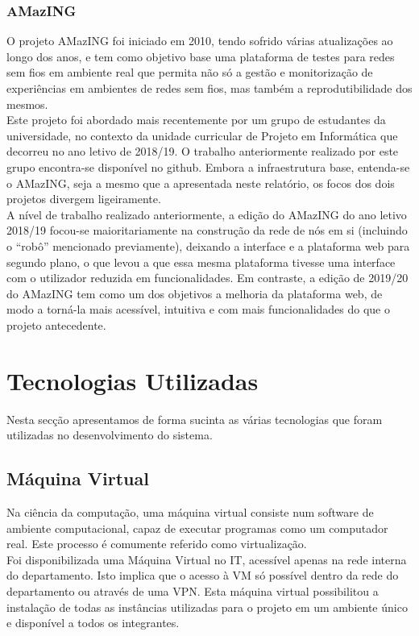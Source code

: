 \subsubsection{AMazING}
O projeto AMazING foi iniciado em 2010, tendo sofrido várias atualizações ao longo dos anos, e tem como objetivo base uma plataforma de testes para redes sem fios em ambiente real que permita não só a gestão e monitorização de experiências em ambientes de redes sem fios, mas também a reprodutibilidade dos mesmos.\newline\\
Este projeto foi abordado mais recentemente por um grupo de estudantes da universidade, no contexto da unidade curricular de Projeto em Informática que decorreu no ano letivo de 2018/19. O trabalho anteriormente realizado por este grupo encontra-se disponível no github. Embora a infraestrutura base, entenda-se o AMazING, seja a mesmo que a apresentada neste relatório, os focos dos dois projetos divergem ligeiramente.\newline\\
A nível de trabalho realizado anteriormente, a edição do AMazING do ano letivo 2018/19 focou-se maioritariamente na construção da rede de nós em si (incluindo o “robô” mencionado previamente), deixando a interface e a plataforma web para segundo plano, o que levou a que essa mesma plataforma tivesse uma interface com o utilizador reduzida em funcionalidades. Em contraste, a edição de 2019/20 do AMazING tem como um dos objetivos a melhoria da plataforma web, de modo a torná-la mais acessível, intuitiva e com mais funcionalidades do que o projeto antecedente.


\section{Tecnologias Utilizadas}
Nesta secção apresentamos de forma sucinta as várias tecnologias que foram utilizadas no desenvolvimento do sistema.

\subsection{Máquina Virtual}
Na ciência da computação, uma máquina virtual consiste num software de ambiente computacional, capaz de executar programas como um computador real. Este processo é comumente referido como virtualização. \cite{virtual}\newline\\
Foi disponibilizada uma Máquina Virtual no IT, acessível apenas na rede interna do departamento. Isto implica que o acesso à VM só possível dentro da rede do departamento ou através de uma VPN. Esta máquina virtual possibilitou a instalação de todas as instâncias utilizadas para o projeto em um ambiente único e disponível a todos os integrantes.


